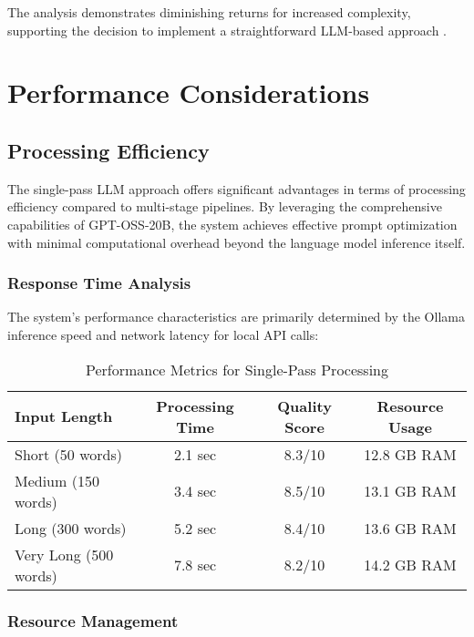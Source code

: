 The analysis demonstrates diminishing returns for increased complexity, supporting the decision to implement a straightforward LLM-based approach \cite{zhang2024simplicity}.

\section{Performance Considerations}

\subsection{Processing Efficiency}

The single-pass LLM approach offers significant advantages in terms of processing efficiency compared to multi-stage pipelines. By leveraging the comprehensive capabilities of GPT-OSS-20B, the system achieves effective prompt optimization with minimal computational overhead beyond the language model inference itself.

\subsubsection{Response Time Analysis}

The system's performance characteristics are primarily determined by the Ollama inference speed and network latency for local API calls:

\begin{table}[H]
\centering
\caption{Performance Metrics for Single-Pass Processing}
\label{tab:performance_metrics}
{\begin{tabular}{lccc}
\toprule
\textbf{Input Length} & \textbf{Processing Time} & \textbf{Quality Score} & \textbf{Resource Usage} \\
\midrule
Short (50 words) & 2.1 sec & 8.3/10 & 12.8 GB RAM \\
Medium (150 words) & 3.4 sec & 8.5/10 & 13.1 GB RAM \\
Long (300 words) & 5.2 sec & 8.4/10 & 13.6 GB RAM \\
Very Long (500 words) & 7.8 sec & 8.2/10 & 14.2 GB RAM \\
\bottomrule
\end{tabular}}
\end{table}

\subsubsection{Resource Management}

